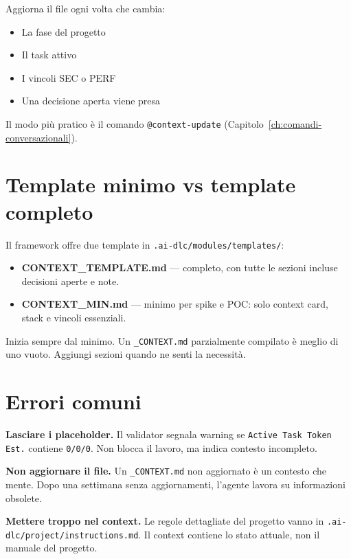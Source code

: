 Aggiorna il file ogni volta che cambia:
\begin{itemize}
  \item La fase del progetto
  \item Il task attivo
  \item I vincoli SEC o PERF
  \item Una decisione aperta viene presa
\end{itemize}

Il modo più pratico è il comando \texttt{@context-update} (Capitolo~\ref{ch:comandi-conversazionali}).

\section{Template minimo vs template completo}
\label{sec:04-template}

Il framework offre due template in \texttt{.ai-dlc/modules/templates/}:

\begin{itemize}
  \item \textbf{CONTEXT\_TEMPLATE.md} --- completo, con tutte le sezioni incluse decisioni aperte e note.
  \item \textbf{CONTEXT\_MIN.md} --- minimo per spike e POC: solo context card, stack e vincoli essenziali.
\end{itemize}

\begin{tipbox}
Inizia sempre dal minimo. Un \texttt{\_CONTEXT.md} parzialmente compilato è meglio di uno vuoto. Aggiungi sezioni quando ne senti la necessità.
\end{tipbox}

\section{Errori comuni}
\label{sec:04-errori}

\textbf{Lasciare i placeholder.} Il validator segnala warning se \texttt{Active Task Token Est.} contiene \texttt{0/0/0}. Non blocca il lavoro, ma indica contesto incompleto.

\textbf{Non aggiornare il file.} Un \texttt{\_CONTEXT.md} non aggiornato è un contesto che mente. Dopo una settimana senza aggiornamenti, l'agente lavora su informazioni obsolete.

\textbf{Mettere troppo nel context.} Le regole dettagliate del progetto vanno in \texttt{.ai-dlc/project/instructions.md}. Il context contiene lo stato attuale, non il manuale del progetto.

